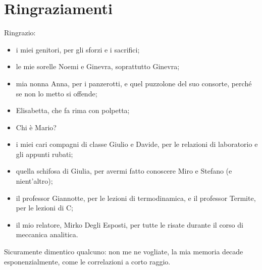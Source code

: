 
\clearpage
\chapter*{Ringraziamenti}

Ringrazio:

\begin{itemize}
  \setlength{\itemsep}{0.7em}

  \item i miei genitori, per gli sforzi e i sacrifici;

  \item le mie sorelle Noemi e Ginevra, soprattutto Ginevra;

  \item mia nonna Anna, per i panzerotti, e quel puzzolone del suo consorte,
    perché se non lo metto si offende;

  \item Elisabetta, che fa rima con polpetta;

  \item Chi è Mario?

  \item i miei cari compagni di classe Giulio e Davide, per le relazioni di
    laboratorio e gli appunti rubati;

  \item quella schifosa di Giulia, per avermi fatto conoscere Miro e Stefano
    (e \mbox{nient'altro});

  \item il professor Giannotte, per le lezioni di termodinamica, e il
    professor Termite, per le lezioni di C;

  \item il mio relatore, Mirko Degli Esposti, per tutte le risate durante il
    corso di meccanica analitica.
\end{itemize}

\vspace{1em}
Sicuramente dimentico qualcuno: non me ne vogliate, la mia memoria decade
esponenzialmente, come le correlazioni a corto raggio.
